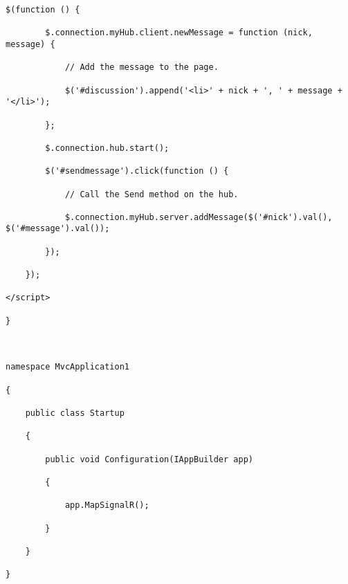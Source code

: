 \documentclass[a4paper,10pt]{scrreprt}
\begin{document}
\begin{lstlisting}[caption=signalr example 1]
    $(function () {

        $.connection.myHub.client.newMessage = function (nick, message) {

            // Add the message to the page.

            $('#discussion').append('<li>' + nick + ', ' + message + '</li>');

        };

        $.connection.hub.start();

        $('#sendmessage').click(function () {

            // Call the Send method on the hub.

            $.connection.myHub.server.addMessage($('#nick').val(), $('#message').val());

        });

    });

</script>

}



namespace MvcApplication1

{

    public class Startup

    {

        public void Configuration(IAppBuilder app)

        {

            app.MapSignalR();

        }

    }

} 
\end{lstlisting}
\end{document}
